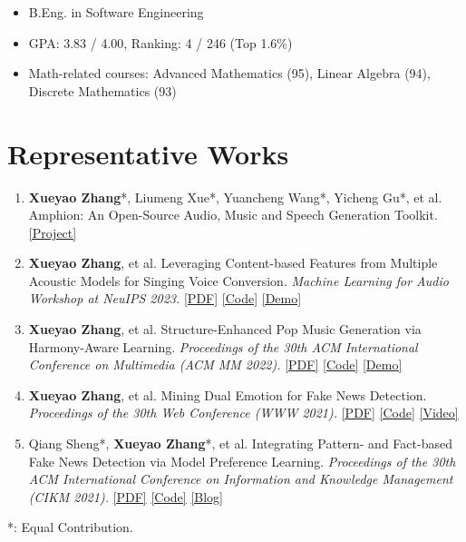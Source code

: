 \documentclass{resume}
\begin{document}
{
  \small
  \begin{itemize}
    \item B.Eng. in Software Engineering
    \item GPA: 3.83 / 4.00, Ranking: 4 / 246 (Top 1.6\%)
    \item Math-related courses: Advanced Mathematics (95), Linear Algebra (94), Discrete
          Mathematics (93)
  \end{itemize}
}

\section{Representative Works}

\begin{enumerate}\itemsep 0.5em
  \item \textbf{Xueyao Zhang}*, Liumeng Xue*, Yuancheng Wang*, Yicheng Gu*, et al. Amphion: An Open-Source Audio, Music and Speech Generation Toolkit. \href{https://github.com/open-mmlab/Amphion}{[Project]}
  \item \textbf{Xueyao Zhang}, et al. Leveraging Content-based Features from Multiple Acoustic Models for Singing Voice Conversion. \textit{Machine Learning for Audio Workshop at NeuIPS 2023.} \href{https://arxiv.org/pdf/2310.11160.pdf}{[PDF]} \href{https://github.com/open-mmlab/Amphion/tree/main/egs/svc/MultipleContentsSVC}{[Code]} \href{https://www.zhangxueyao.com/data/MultipleContentsSVC/index.html}{[Demo]}
  \item \textbf{Xueyao Zhang}, et al. Structure-Enhanced Pop Music Generation via Harmony-Aware Learning. \textit{Proceedings of the 30th ACM International Conference on Multimedia (ACM MM 2022).} \href{https://dl.acm.org/doi/10.1145/3503161.3548084}{[PDF]} \href{https://github.com/RMSnow/HAT}{[Code]} \href{https://www.zhangxueyao.com/data/HAT/demo.html}{[Demo]}
  \item \textbf{Xueyao Zhang}, et al. Mining Dual Emotion for Fake News Detection. \textit{Proceedings of the 30th Web Conference (WWW 2021).} \href{https://dl.acm.org/doi/pdf/10.1145/3442381.3450004}{[PDF]} \href{https://github.com/RMSnow/WWW2021}{[Code]} \href{https://www.bilibili.com/video/BV13o4y1m7c3}{[Video]}
  \item Qiang Sheng*, \textbf{Xueyao Zhang}*, et al. Integrating Pattern- and
        Fact-based Fake News Detection via Model Preference Learning.
        \textit{Proceedings of the 30th ACM International Conference on Information and
          Knowledge Management (CIKM 2021).} \href{https://dl.acm.org/doi/10.1145/3459637.3482440}{[PDF]}
          \href{https://github.com/ICTMCG/Pref-FEND}{[Code]}
          \href{https://zhuanlan.zhihu.com/p/414464291}{[Blog]}
\end{enumerate}
*: Equal Contribution.
\end{document}
